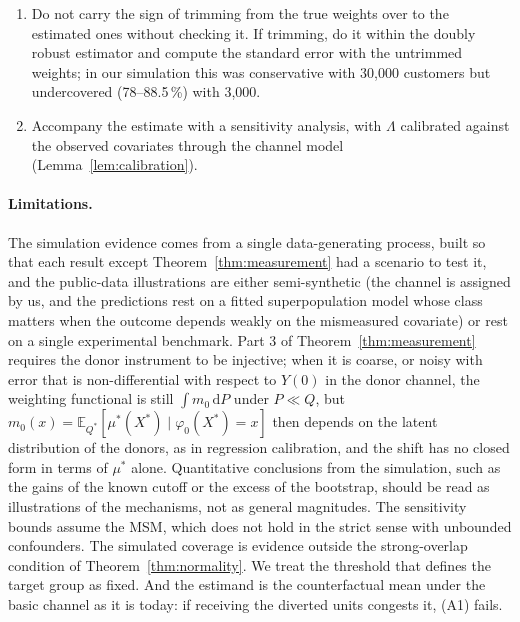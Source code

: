 \documentclass[11pt,a4paper]{article}
\newcommand{\E}{\mathbb{E}}
\newcommand{\dd}{\,\mathrm{d}}
\theoremstyle{plain}
\theoremstyle{definition}
\begin{document}
\begin{enumerate}
  \item Do not carry the sign of trimming from the true weights over to the estimated ones without checking it. If trimming, do it within the doubly robust estimator and compute the standard error with the untrimmed weights; in our simulation this was conservative with 30{,}000 customers but undercovered (78--88.5\,\%) with 3{,}000.
  \item Accompany the estimate with a sensitivity analysis, with $\Lambda$ calibrated against the observed covariates through the channel model (Lemma~\ref{lem:calibration}).
\end{enumerate}

\paragraph{Limitations.} The simulation evidence comes from a single data-generating process, built so that each result except Theorem~\ref{thm:measurement} had a scenario to test it, and the public-data illustrations are either semi-synthetic (the channel is assigned by us, and the predictions rest on a fitted superpopulation model whose class matters when the outcome depends weakly on the mismeasured covariate) or rest on a single experimental benchmark. Part 3 of Theorem~\ref{thm:measurement} requires the donor instrument to be injective; when it is coarse, or noisy with error that is non-differential with respect to $Y(0)$ in the donor channel, the weighting functional is still $\int m_0\dd P$ under $P\ll Q$, but $m_0(x)=\E_{Q^*}[\mu^*(X^*)\mid\varphi_0(X^*)=x]$ then depends on the latent distribution of the donors, as in regression calibration, and the shift has no closed form in terms of $\mu^*$ alone. Quantitative conclusions from the simulation, such as the gains of the known cutoff or the excess of the bootstrap, should be read as illustrations of the mechanisms, not as general magnitudes. The sensitivity bounds assume the MSM, which does not hold in the strict sense with unbounded confounders. The simulated coverage is evidence outside the strong-overlap condition of Theorem~\ref{thm:normality}. We treat the threshold that defines the target group as fixed. And the estimand is the counterfactual mean under the basic channel as it is today: if receiving the diverted units congests it, (A1) fails.
\end{document}
